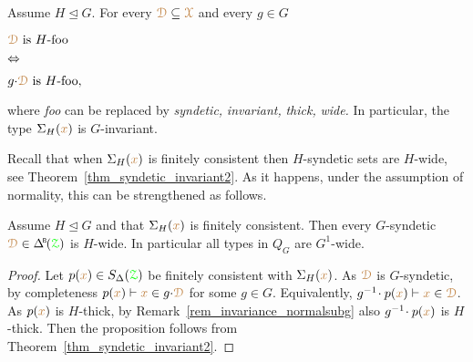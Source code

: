 \begin{remark}\label{rem_invariance_normalsubg}
\def\medrel#1{\parbox[t]{5ex}{$\displaystyle\hfil #1$}}
\def\ceq#1#2#3{\parbox[t]{20ex}{$\displaystyle #1$}\medrel{#2}{$\displaystyle #3$}}
  Assume $H\trianglelefteq G$.
  For every ${\color{brown}\EuScript D}\subseteq{\color{brown}\EuScript X}$ and every $g\in G$ \smallskip
  
  \ceq{\hfill\mrD\textrm{ is }H\textrm{-foo}}{\IFF}{g{\cdot}\mrD\textrm{ is }H\textrm{-foo},} \smallskip
  
  where \textit{foo\/} can be replaced by \textit{syndetic,} \textit{invariant,} \textit{thick,} \textit{wide.}
  In particular, the type $\Sigma_H({\color{brown} x})$ is $G$-invariant.
\end{remark}

Recall that when $\Sigma_H({\color{brown} x})$ is finitely consistent then $H$-syndetic sets are $H$-wide, see Theorem~\ref{thm_syndetic_invariant2}.
As it happens, under the assumption of normality, this can be strengthened as follows.

\begin{proposition}\label{prop_Gsyndetic_Hthick1}
  Assume $H\trianglelefteq G$ and that $\Sigma_H({\color{brown} x})$ is finitely consistent.
  Then every $G$-syndetic $\mrD\in\BDelta(\grZ)$ is $H$-wide.
  In particular all types in $Q_G$ are $G^1$-wide.
\end{proposition}

\begin{proof}
  Let $p({\color{brown} x})\in S_\Delta({\color{green}\EuScript Z})$ be finitely consistent with $\Sigma_H({\color{brown} x})$.
  As ${\color{brown}\EuScript D}$ is $G$-syndetic, by completeness $p({\color{brown} x})\vdash{\color{brown}x}\in g{\cdot}{\color{brown}\EuScript D}$ for some $g\in G$.
  Equivalently, $g^{-1}\!\cdot p({\color{brown} x})\vdash{\color{brown}x}\in{\color{brown}\EuScript D}$.
  As $p({\color{brown} x})$ is $H$-thick, by Remark~\ref{rem_invariance_normalsubg} also $g^{-1}\!\cdot p({\color{brown} x})$ is $H$-thick.
  Then the proposition follows from Theorem~\ref{thm_syndetic_invariant2}.
\end{proof}

